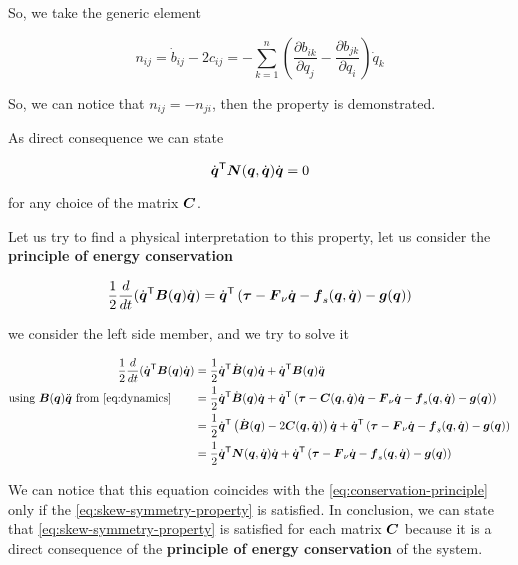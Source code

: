 So, we take the generic element

\[
	n_{ij} = \dot{b}_{ij} - 2 c_{ij} = - \sum_{k=1}^n \left( \frac{\partial b_{ik}}{\partial q_j} - \frac{\partial b_{jk}}{\partial q_i} \right) \dot{q}_k
\]

So, we can notice that  $n_{ij} = - n_{ji}$, then the property is demonstrated.

As direct consequence we can state

\begin{equation}
    \dq^\trans \matr N(\q,\dq) \dq = 0 \label{eq:skew-symmetry-property}
\end{equation}

for any choice of the matrix $\matr C$.

Let us try to find a physical interpretation to this property, let us consider the \textbf{principle of energy conservation}

\begin{equation}
    \frac{1}{2} \frac{d}{dt} (\dq^\trans \matr B(\q)\dq) = \dq^\trans \left( \vect \tau - \matr{F}_\nu\dq - \matr{f}_s(\q,\dq) - \vect{g}(\q) \right) \label{eq:conservation-principle}
\end{equation}

we consider the left side member, and we try to solve it

\begin{align*}
    \frac{1}{2} \frac{d}{dt} (\dq^\trans \matr B(\q)\dq) &= \frac{1}{2} \dq^\trans \dot{\matr B}(\q)\dq + \dq^\trans \matr B(\q)\ddq \\
    \text{using $\matr B(\q)\ddq$ from \ref{eq:dynamics}} \qquad &= \frac{1}{2} \dq^\trans \dot{\matr B}(\q)\dq + \dq^\trans \left( \vect{\tau} - \matr{C}(\q,\dq)\dq - \matr{F}_\nu\dq - \matr{f}_s(\q,\dq) - \vect{g}(\q) \right) \\
	&= \frac{1}{2} \dq^\trans \left( \dot{\matr B}(\q) - 2 \matr{C}(\q,\dq) \right)\dq + \dq^\trans \left( \vect{\tau} - \matr{F}_\nu\dq - \matr{f}_s(\q,\dq) - \vect{g}(\q) \right) \\
    &= \frac{1}{2} \dq^\trans \matr N(\q,\dq) \dq + \dq^\trans \left( \vect{\tau} - \matr{F}_\nu\dq - \matr{f}_s(\q,\dq) - \vect{g}(\q) \right)
\end{align*}

We can notice that this equation coincides with the \autoref{eq:conservation-principle} only if the \autoref{eq:skew-symmetry-property} is satisfied.
In conclusion, we can state that \autoref{eq:skew-symmetry-property} is satisfied for each matrix $\matr C$ because it is a direct consequence of the \textbf{principle of energy conservation} of the system.

